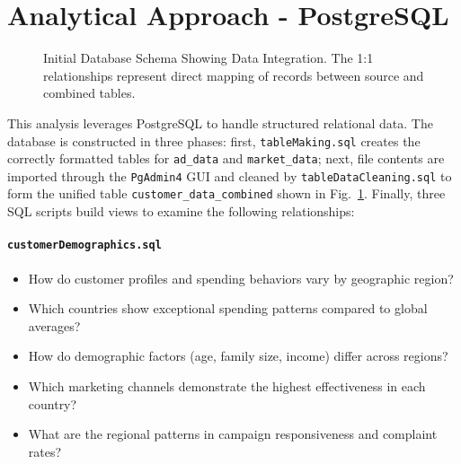 \documentclass[12pt,a4paper]{article}
\newcommand{\textittt}[1]{\texttt{#1}}
\begin{document}
\section{Analytical Approach - PostgreSQL}
\begin{figure}[h!]
\centering
{}
\caption{Initial Database Schema Showing Data Integration. The 1:1 relationships represent direct mapping of records between source and combined tables.}
\label{fig:initial-schema}
\end{figure}
\noindent This analysis leverages PostgreSQL to handle structured relational data. The database is constructed in three phases: first, \textittt{tableMaking.sql} creates the correctly formatted tables for \textittt{ad\_data} and \textittt{market\_data}; next, file contents are imported through the \textittt{PgAdmin4} GUI and cleaned by \textittt{tableDataCleaning.sql} to form the unified table \textittt{customer\_data\_combined} shown in Fig.~\ref{fig:initial-schema}. Finally, three SQL scripts build views to examine the following relationships:
\paragraph{\textittt{customerDemographics.sql}}
{\footnotesize
\begin{itemize}
    \item How do customer profiles and spending behaviors vary by geographic region?
    \item Which countries show exceptional spending patterns compared to global averages?
    \item How do demographic factors (age, family size, income) differ across regions?
    \item Which marketing channels demonstrate the highest effectiveness in each country?
    \item What are the regional patterns in campaign responsiveness and complaint rates?
\end{itemize}
}
\end{document}
